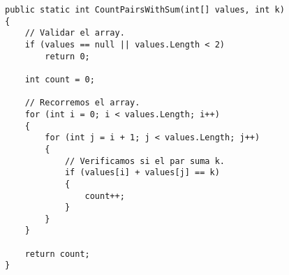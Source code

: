 \begin{lstlisting}
public static int CountPairsWithSum(int[] values, int k)
{
    // Validar el array.
    if (values == null || values.Length < 2)
        return 0;

    int count = 0;

    // Recorremos el array.
    for (int i = 0; i < values.Length; i++)
    {
        for (int j = i + 1; j < values.Length; j++)
        {
            // Verificamos si el par suma k.
            if (values[i] + values[j] == k)
            {
                count++;
            }
        }
    }

    return count;
}
\end{lstlisting}
